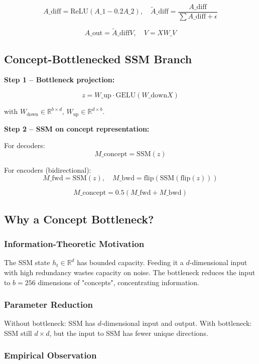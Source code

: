 \[
A\_\text{diff} = \text{ReLU}(A\_1 - 0.2 A\_2), \quad
\tilde{A}\_\text{diff} = \frac{A\_\text{diff}}{\sum A\_\text{diff} + \epsilon}
\tag{4.3}
\]

\[
A\_\text{out} = \tilde{A}\_\text{diff} V, \quad V = X W\_V
\tag{4.4}
\]

\subsection{Concept-Bottlenecked SSM Branch}

\textbf{Step 1 -- Bottleneck projection:}

\[
z = W\_\text{up} \cdot \text{GELU}(W\_\text{down} X)
\tag{4.5}
\]

with $W_\text{down} \in \mathbb{R}^{b \times d}$, $W_\text{up} \in \mathbb{R}^{d \times b}$.

\textbf{Step 2 -- SSM on concept representation:}

For decoders:
\[
M\_\text{concept} = \text{SSM}(z)
\tag{4.6}
\]

For encoders (bidirectional):
\[
M\_\text{fwd} = \text{SSM}(z), \quad M\_\text{bwd} = \text{flip}(\text{SSM}(\text{flip}(z)))
\tag{4.7}
\]

\[
M\_\text{concept} = 0.5(M\_\text{fwd} + M\_\text{bwd})
\tag{4.8}
\]

\subsection{Why a Concept Bottleneck?}

\subsubsection{Information-Theoretic Motivation}

The SSM state $h_t \in \mathbb{R}^d$ has bounded capacity. Feeding it a 
$d$-dimensional input with high redundancy wastes capacity on noise. The 
bottleneck reduces the input to $b = 256$ dimensions of "concepts", 
concentrating information.

\subsubsection{Parameter Reduction}

Without bottleneck: SSM has $d$-dimensional input and output.
With bottleneck: SSM still $d \times d$, but the input to SSM has fewer 
unique directions.

\subsubsection{Empirical Observation}

